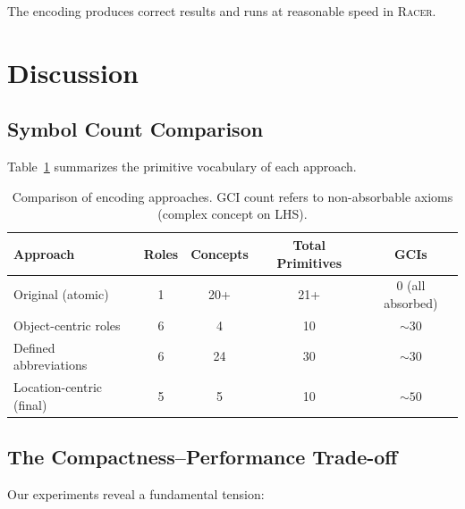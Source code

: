 \documentclass[11pt,a4paper]{article}
\newcommand{\Racer}{\textsc{Racer}}
\begin{document}
The encoding produces correct results and runs at reasonable speed in \Racer{}.

\section{Discussion}
\label{sec:discussion}

\subsection{Symbol Count Comparison}

Table~\ref{tab:comparison} summarizes the primitive vocabulary of each
approach.

\begin{table}[ht]
\centering
\begin{tabular}{lcccc}
\toprule
\textbf{Approach} & \textbf{Roles} & \textbf{Concepts} & \textbf{Total Primitives} & \textbf{GCIs} \\
\midrule
Original (atomic)        & 1 & 20+ & 21+ & 0 (all absorbed)\\
Object-centric roles     & 6 & 4   & 10  & ${\sim}30$ \\
Defined abbreviations    & 6 & 24  & 30  & ${\sim}30$ \\
Location-centric (final) & 5 & 5   & 10  & ${\sim}50$ \\
\bottomrule
\end{tabular}
\caption{Comparison of encoding approaches. GCI count refers to
non-absorbable axioms (complex concept on LHS).}
\label{tab:comparison}
\end{table}

\subsection{The Compactness--Performance Trade-off}

Our experiments reveal a fundamental tension:
\end{document}
